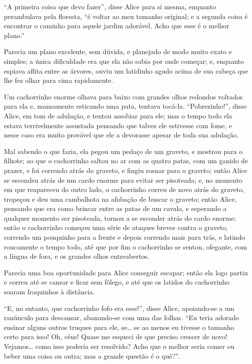 ``A primeira coisa que devo fazer'', disse Alice para si mesma, enquanto
perambulava pela floresta, ``é voltar ao meu tamanho original; e a
segunda coisa é encontrar o caminho para aquele jardim adorável. Acho
que esse é o melhor plano.''

Parecia um plano excelente, sem dúvida, e planejado de modo muito exato
e simples; a única dificuldade era que ela não sabia por onde
começar; e, enquanto espiava aflita entre as árvores, ouviu um latidinho
agudo acima de sua cabeça que lhe fez olhar para cima rapidamente.

Um cachorrinho enorme olhava para baixo com grandes olhos redondos
voltados para ela e, mansamente esticando uma pata, tentava tocá-la.
``Pobrezinho!'', disse Alice, em tom de adulação, e tentou assobiar para
ele; mas o tempo todo ela estava terrivelmente assustada pensando que
talvez ele estivesse com fome, e nesse caso era muito provável que ele a
devorasse apesar de toda sua adulação.

Mal sabendo o que fazia, ela pegou um pedaço de um graveto, e mostrou
para o filhote; ao que o cachorrinho saltou no ar com as quatro patas,
com um ganido de prazer, e foi correndo atrás do graveto, e fingiu
rosnar para o graveto; então Alice se escondeu atrás de um cardo enorme
para evitar ser pisoteada; e, no momento em que reapareceu do outro
lado, o cachorrinho correu de novo atrás do graveto, tropeçou e deu
uma cambalhota na afobação de buscar o graveto; então Alice, pensando
que era como brincar entre as patas de um cavalo, e esperando a qualquer
momento ser pisoteada, tornou a se esconder atrás do cardo enorme;
então o cachorrinho começou uma série de ataques breves contra o
graveto, correndo um pouquinho para a frente e depois correndo mais para
trás, e latindo roucamente o tempo todo, até que por fim o cachorrinho
se sentou, ofegante, com a língua de fora, e os grandes olhos
entreabertos.

Parecia uma boa oportunidade para Alice conseguir escapar; então ela
logo partiu e correu até se cansar e ficar sem fôlego, e até que os
latidos do cachorrinho soaram fraquinhos à distância.

``E, no entanto, que cachorrinho fofo era esse!'', disse Alice,
apoiando-se a um ranúnculo para descansar, abanando-se com uma das
folhas. ``Eu teria adorado ensinar alguns outros truques para ele, se\ldots{}
se ao menos eu tivesse o tamanho certo para isso! Oh, céus! Quase me
esqueci de que preciso crescer de novo! Vejamos\ldots{} como isso poderia ser
resolvido? Acho que o melhor seria comer ou beber uma coisa ou outra;
mas a grande questão é o quê?''.

